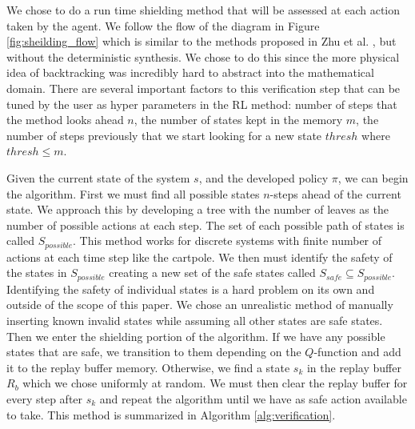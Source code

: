 \documentclass[acmsmall,review,authorversion]{acmart}
\begin{document}
We chose to do a run time shielding method that will be assessed at each action taken by the agent. We follow the flow of the diagram in Figure \ref{fig:sheilding_flow} which is similar to the methods proposed in Zhu et al. \cite{zhu:2019}, but without the deterministic synthesis. We chose to do this since the more physical idea of backtracking was incredibly hard to abstract into the mathematical domain. There are several important factors to this verification step that can be tuned by the user as hyper parameters in the RL method: number of steps that the method looks ahead $n$, the number of states kept in the memory $m$, the number of steps previously that we start looking for a new state $thresh$ where $thresh \leq m$. 

Given the current state of the system $s$, and the developed policy $\pi$, we can begin the algorithm. First we must find all possible states $n$-steps ahead of the current state. We approach this by developing a tree with the number of leaves as the number of possible actions at each step. The set of each possible path of states is called $S_{possible}$. This method works for discrete systems with finite number of actions at each time step like the cartpole. We then must identify the safety of the states in $S_{possible}$ creating a new set of the safe states called $ S_{safe} \subseteq S_{possible}$. Identifying the safety of individual states is a hard problem on its own and outside of the scope of this paper. We chose an unrealistic method of manually inserting known invalid states while assuming all other states are safe states. Then we enter the shielding portion of the algorithm. If we have any possible states that are safe, we transition to them depending on the $Q$-function and add it to the replay buffer memory. Otherwise, we find a state $s_k$ in the replay buffer $R_b$ which we chose uniformly at random. We must then clear the replay buffer for every step after $s_k$ and repeat the algorithm until we have as safe action available to take. This method is summarized in Algorithm \ref{alg:verification}.


\end{document}
